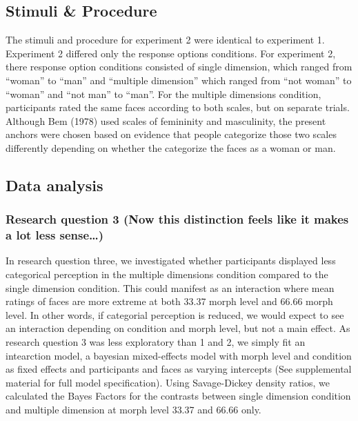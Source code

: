 \documentclass[
  man]{apa7}
\begin{document}
\hypertarget{stimuli-procedure}{%
\subsection{Stimuli \& Procedure}\label{stimuli-procedure}}

The stimuli and procedure for experiment 2 were identical to experiment 1. Experiment 2 differed only the response options conditions. For experiment 2, there response option conditions consisted of single dimension, which ranged from ``woman'' to ``man'' and ``multiple dimension'' which ranged from ``not woman'' to ``woman'' and ``not man'' to ``man''. For the multiple dimensions condition, participants rated the same faces according to both scales, but on separate trials. Although Bem (1978) used scales of femininity and masculinity, the present anchors were chosen based on evidence that people categorize those two scales differently depending on whether the categorize the faces as a woman or man.

\hypertarget{data-analysis-1}{%
\subsection{Data analysis}\label{data-analysis-1}}

\hypertarget{research-question-3-now-this-distinction-feels-like-it-makes-a-lot-less-sense}{%
\subsubsection{Research question 3 (Now this distinction feels like it makes a lot less sense\ldots)}\label{research-question-3-now-this-distinction-feels-like-it-makes-a-lot-less-sense}}

In research question three, we investigated whether participants displayed less categorical perception in the multiple dimensions condition compared to the single dimension condition. This could manifest as an interaction where mean ratings of faces are more extreme at both 33.37 morph level and 66.66 morph level. In other words, if categorial perception is reduced, we would expect to see an interaction depending on condition and morph level, but not a main effect. As research question 3 was less exploratory than 1 and 2, we simply fit an intearction model, a bayesian mixed-effects model with morph level and condition as fixed effects and participants and faces as varying intercepts (See supplemental material for full model specification). Using Savage-Dickey density ratios, we calculated the Bayes Factors for the contrasts between single dimension condition and multiple dimension at morph level 33.37 and 66.66 only.
\end{document}
